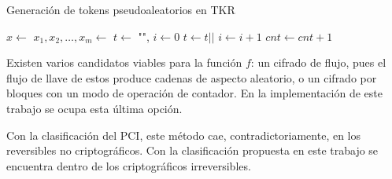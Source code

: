 \begin{algorithm}
  \caption{\label{tkr_rn} Generación de tokens pseudoaleatorios en TKR}
  \begin{algorithmic}[1]
      \State $ x \gets $ 
      \State $ x_1, x_2, \dots, x_m \gets $
      \State $ t \gets $ "", $ i \gets 0 $
          \State $ t \gets t || $ 
        \EndIf
        \State $ i \gets i + 1 $
      \EndWhile
      \State $ cnt \gets cnt + 1 $
    \EndFunction
  \end{algorithmic}
\end{algorithm}

Existen varios candidatos viables para la función $ f $: un cifrado de flujo,
pues el flujo de llave de estos produce cadenas de aspecto aleatorio, o un
cifrado por bloques con un modo de operación de contador. En la implementación
de este trabajo se ocupa esta última opción.

Con la clasificación del PCI, este método cae, contradictoriamente, en los
reversibles no criptográficos. Con la clasificación propuesta en este trabajo se
encuentra dentro de los criptográficos irreversibles.
